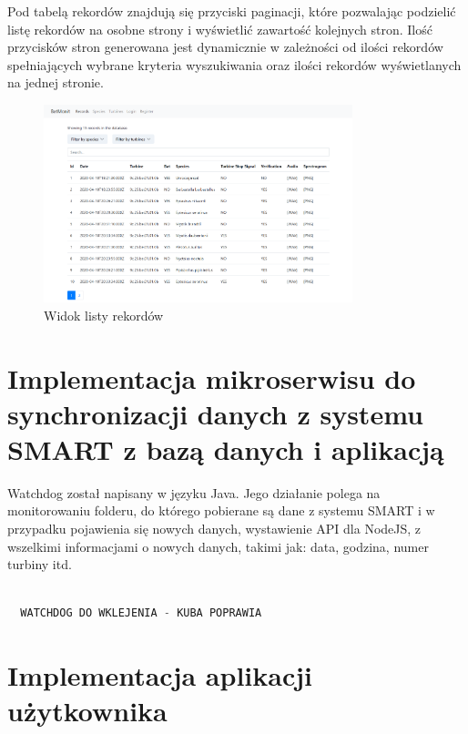 \documentclass{sprz}
\begin{document}
Pod tabelą rekordów znajdują się przyciski paginacji, które pozwalając podzielić listę rekordów na osobne strony i wyświetlić zawartość kolejnych stron. Ilość przycisków stron generowana jest dynamicznie w zależności od ilości rekordów spełniających wybrane kryteria wyszukiwania oraz ilości rekordów wyświetlanych na jednej stronie.

\begin{figure}[h]
  \centering
  \includegraphics[width=0.8\textwidth]{sprz/app_records}
  \caption{Widok listy rekordów}
  \label{img:app_records}
\end{figure}

\chapter{Implementacja mikroserwisu do synchronizacji danych z systemu SMART z bazą danych i aplikacją}

Watchdog został napisany w języku Java. Jego działanie polega na monitorowaniu folderu, do którego pobierane są dane z systemu SMART i w przypadku pojawienia się nowych danych, wystawienie API dla NodeJS, z wszelkimi informacjami o nowych danych, takimi jak: data, godzina, numer turbiny itd. 

\begin{lstlisting}[language=Java,caption={Implementacja watchdoga do synchronizacji dźwięków z systemu SMART z bazą danych i aplikacją}, label={lst:watchdog}]

  WATCHDOG DO WKLEJENIA - KUBA POPRAWIA

\end{lstlisting}
\clearpage


\chapter{Implementacja aplikacji użytkownika}
\end{document}
